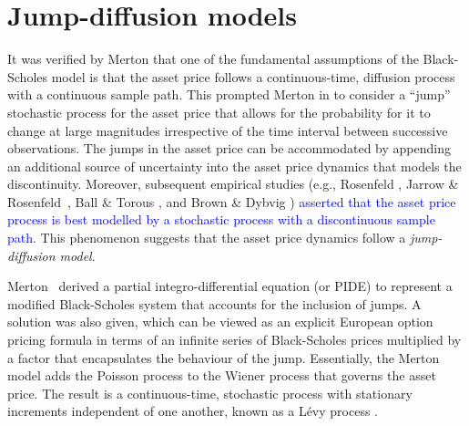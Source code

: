 \section{Jump-diffusion models}
	It was verified by Merton \cite{Merton1973b} that one of the fundamental assumptions of the Black-Scholes model is that the asset price follows a continuous-time, diffusion process with a continuous sample path. This prompted Merton in \cite{Merton1976} to consider a ``jump'' stochastic process for the asset price that allows for the probability for it to change at large magnitudes irrespective of the time interval between successive observations. The jumps in the asset price can be accommodated by appending an additional source of uncertainty into the asset price dynamics that models the discontinuity. Moreover, subsequent empirical studies (e.g., Rosenfeld \cite{Rosenfeld1980}, Jarrow \& Rosenfeld~\cite{Jarrow1984}, Ball \& Torous \cite{Ball1985}, and Brown \& Dybvig \cite{Brown1986}) \textcolor{blue}{asserted that the asset price process is best modelled by a stochastic process with a discontinuous sample path}. This phenomenon suggests that the asset price dynamics follow a  \emph{jump-diffusion model}.

Merton~\cite{Merton1976} derived a partial integro-differential equation (or PIDE) to represent a modified Black-Scholes system that accounts for the inclusion of jumps. A solution was also given, which can be viewed as an explicit European option pricing formula in terms of an infinite series of Black-Scholes prices multiplied by a factor that encapsulates the behaviour of the jump. Essentially, the Merton model adds the Poisson process to the Wiener process that governs the asset price. The result is a continuous-time, stochastic process with stationary increments independent of one another, known as a L\'{e}vy process \cite{Platen2010}.

